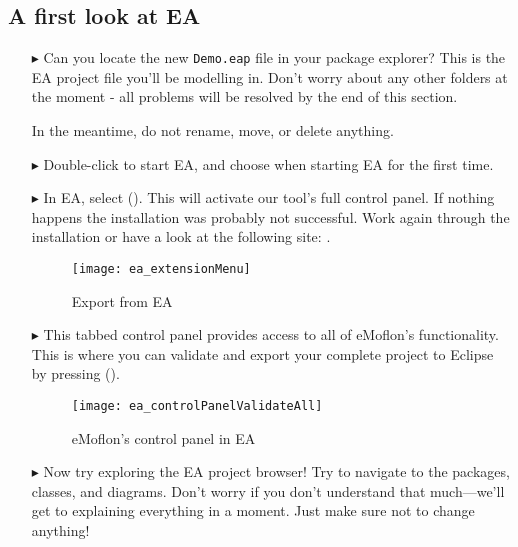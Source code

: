 \clearpage
\genHeader

\subsection{A first look at EA}

\begin{itemize}
\FloatBarrier
\hypertarget{simpleDemo vis}{}
\item[$\blacktriangleright$] Can you locate the new \texttt{Demo.eap} file in your package explorer? This is the EA project file you'll be
modelling in. Don't worry about any other folders at the moment - all problems will be resolved by the end of this section.

In the meantime, do not rename, move, or delete anything.

\item[$\blacktriangleright$] Double-click  to start EA, and choose  when starting EA for the first time.

\item[$\blacktriangleright$] In EA, select  ().
This will activate our tool's full control panel.
If nothing happens the installation was probably not successful. 
Work again through the installation or have a look at the following site:
\newline
{}.
%
\begin{figure}[htbp]
	\centering
  \texttt{[image: ea\_extensionMenu]}
	\caption{Export from EA} 
	\label{ea:validate_dropdown} 
\end{figure}
%
\item[$\blacktriangleright$]
This tabbed control panel provides access to all of eMoflon's functionality.
This is where you can validate and export your complete project to Eclipse by pressing  ().
%
\begin{figure}[htbp]
	\centering
  \texttt{[image: ea\_controlPanelValidateAll]}
	\caption{eMoflon's control panel in EA} 
	\label{ea:controlPanel} 
\end{figure}
%
\item[$\blacktriangleright$]
Now try exploring the EA project browser!
Try to navigate to the packages, classes, and diagrams.
Don't worry if you don't understand that much---we'll get to explaining everything in a moment.
Just make sure not to change anything!


\end{itemize}
